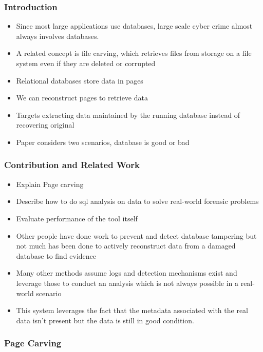 \documentclass[11pt,]{article}
\providecommand{\tightlist}{%
  \setlength{\itemsep}{0pt}\setlength{\parskip}{0pt}}
\begin{document}
\hypertarget{introduction}{%
\subsubsection{Introduction}\label{introduction}}

\begin{itemize}
\tightlist
\item
  Since most large applications use databases, large scale cyber crime
  almost always involves databases.
\item
  A related concept is file carving, which retrieves files from storage
  on a file system even if they are deleted or corrupted
\item
  Relational databases store data in pages
\item
  We can reconstruct pages to retrieve data
\item
  Targets extracting data maintained by the running database instead of
  recovering original
\item
  Paper considers two scenarios, database is good or bad
\end{itemize}

\hypertarget{contribution-and-related-work}{%
\subsubsection{Contribution and Related
Work}\label{contribution-and-related-work}}

\begin{itemize}
\tightlist
\item
  Explain Page carving
\item
  Describe how to do sql analysis on data to solve real-world forensic
  problems
\item
  Evaluate performance of the tool itself
\item
  Other people have done work to prevent and detect database tampering
  but not much has been done to actively reconstruct data from a damaged
  database to find evidence
\item
  Many other methods assume logs and detection mechanisms exist and
  leverage those to conduct an analysis which is not always possible in
  a real-world scenario
\item
  This system leverages the fact that the metadata associated with the
  real data isn't present but the data is still in good condition.
\end{itemize}

\hypertarget{page-carving}{%
\subsubsection{Page Carving}\label{page-carving}}
\end{document}
